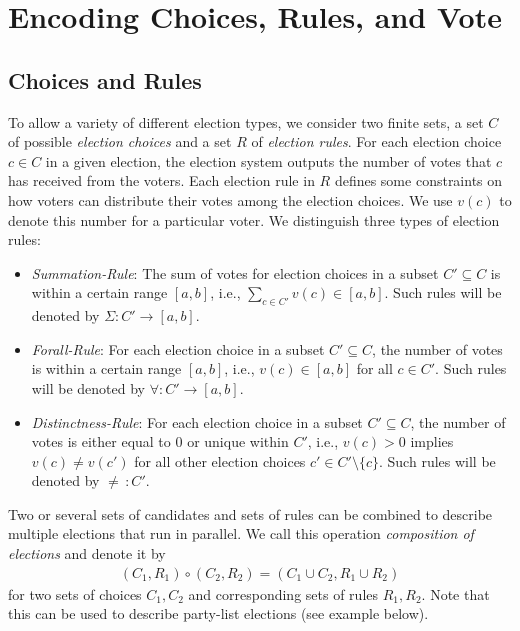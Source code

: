 \documentclass[bibtotoc,halfparskip,oneside]{scrreprt}
\begin{document}
\section{Encoding Choices, Rules, and Vote}

\subsection{Choices and Rules}\label{choices}

To allow a variety of different election types, we consider two finite sets, a set $C$ of possible \emph{election choices} and a set $R$ of \emph{election rules}. For each election choice $c\in C$ in a given election, the election system outputs the number of votes that $c$ has received from the voters. Each election rule in $R$ defines some constraints on how voters can distribute their votes among the election choices. We use $v(c)$ to denote this number for a particular voter. We distinguish three types of election rules:
\begin{itemize}
	\item \emph{Summation-Rule}: The sum of votes for election choices in a subset $C'\subseteq C$ is within a certain range $[a,b]$, i.e., $\sum\limits_{c\in C'}v(c)\in [a,b]$. Such rules will be denoted by $\Sigma:C'\rightarrow[a,b]$.
	\item \emph{Forall-Rule}: For each election choice in a subset $C'\subseteq C$, the number of votes is within a certain range $[a,b]$, i.e., $v(c)\in [a,b]$ for all $c\in C'$. Such rules will be denoted by $\forall:C'\rightarrow[a,b]$. 
	\item \emph{Distinctness-Rule}: For each election choice in a subset $C'\subseteq C$, the number of votes is either equal to $0$ or unique within $C'$, i.e., $v(c)>0$ implies $v(c)\not= v(c')$ for all other election choices $c'\in C'\setminus\{c\}$. Such rules will be denoted by $\not=\,:C'$.
\end{itemize}
Two or several sets of candidates and sets of rules can be combined to describe multiple elections that run in parallel. We call this operation \emph{composition of elections} and denote it by
\begin{align*}
	(C_1,R_1) \circ (C_2,R_2) = (C_1\cup C_2, R_1 \cup R_2)
\end{align*}
for two sets of choices $C_1,C_2$ and corresponding sets of rules $R_1,R_2$. Note that this can be used to describe party-list elections (see example below).
\end{document}
